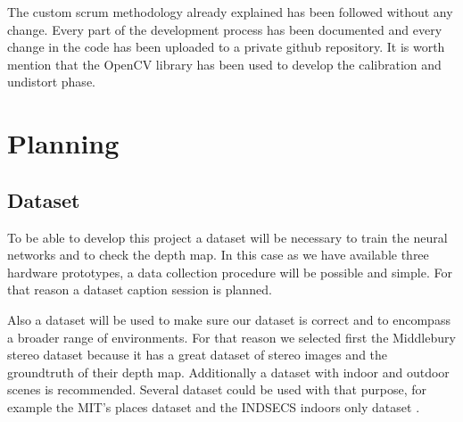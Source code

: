 \documentclass[10pt,a4paper,twocolumn,twoside]{article}
\begin{document}
	The custom scrum methodology already explained has been followed without any change. Every part of the development process has been documented and every change in the code has been uploaded to a private github repository. It is worth mention that the OpenCV \cite{web:opencv} library has been used to develop the calibration and undistort phase. 
	
	\section{Planning}
	\label{sec:planning}
	
	\subsection{Dataset}
	To be able to develop this project a dataset will be necessary to train the neural networks and to check the depth map. In this case as we have available three hardware prototypes, a data collection procedure will be possible and simple. For that reason a dataset caption session is planned.
	
	Also a dataset will be used to make sure our dataset is correct and to encompass a broader range of environments. For that reason we selected first the Middlebury stereo dataset \cite{web:middelburyDataset} because it has a great dataset of stereo images and the groundtruth of their depth map. Additionally a dataset with indoor and outdoor scenes is recommended. Several dataset could be used with that purpose, for example the MIT's places dataset \cite{web:mitplaces} and the INDSECS indoors only dataset \cite{web:indecs}.
	
\end{document}
